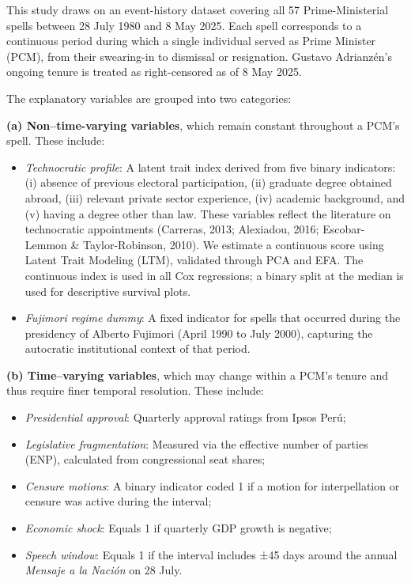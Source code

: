 \documentclass[a4paper, 12pt]{article}
\begin{document}
This study draws on an event-history dataset covering all 57 Prime-Ministerial spells between 28 July 1980 and 8 May 2025. Each spell corresponds to a continuous period during which a single individual served as Prime Minister (PCM), from their swearing-in to dismissal or resignation. Gustavo Adrianzén’s ongoing tenure is treated as right-censored as of 8 May 2025.

The explanatory variables are grouped into two categories:

\textbf{(a) Non–time-varying variables}, which remain constant throughout a PCM’s spell. These include:

\begin{itemize}
    \item \textit{Technocratic profile}: A latent trait index derived from five binary indicators: (i) absence of previous electoral participation, (ii) graduate degree obtained abroad, (iii) relevant private sector experience, (iv) academic background, and (v) having a degree other than law. These variables reflect the literature on technocratic appointments (Carreras, 2013; Alexiadou, 2016; Escobar-Lemmon \& Taylor-Robinson, 2010). We estimate a continuous score using Latent Trait Modeling (LTM), validated through PCA and EFA. The continuous index is used in all Cox regressions; a binary split at the median is used for descriptive survival plots.
    
    \item \textit{Fujimori regime dummy}: A fixed indicator for spells that occurred during the presidency of Alberto Fujimori (April 1990 to July 2000), capturing the autocratic institutional context of that period.
\end{itemize}

\textbf{(b) Time–varying variables}, which may change within a PCM’s tenure and thus require finer temporal resolution. These include:

\begin{itemize}
    \item \textit{Presidential approval}: Quarterly approval ratings from Ipsos Perú;
    \item \textit{Legislative fragmentation}: Measured via the effective number of parties (ENP), calculated from congressional seat shares;
    \item \textit{Censure motions}: A binary indicator coded 1 if a motion for interpellation or censure was active during the interval;
    \item \textit{Economic shock}: Equals 1 if quarterly GDP growth is negative;
    \item \textit{Speech window}: Equals 1 if the interval includes ±45 days around the annual \textit{Mensaje a la Nación} on 28 July.
\end{itemize}
\end{document}
